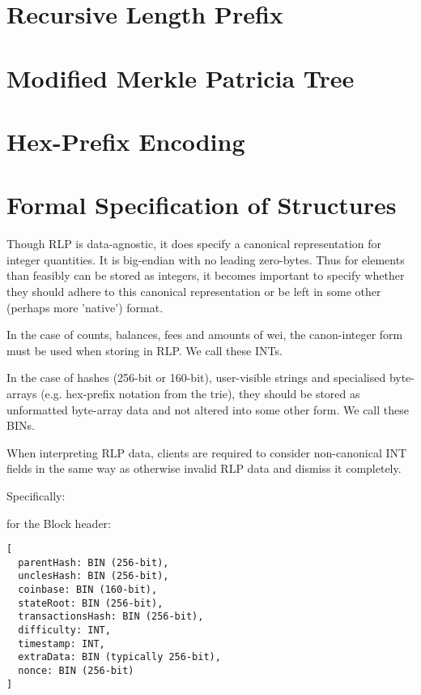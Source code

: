 \documentclass[9pt,oneside]{amsart}
\begin{document}
\begin{multicols}{2}
\begin{description}
\end{description}

\section{Recursive Length Prefix}\label{app:rlp}

\section{Modified Merkle Patricia Tree}\label{app:trie}

\section{Hex-Prefix Encoding}\label{app:hexprefix}

\section{Formal Specification of Structures}

Though RLP is data-agnostic, it does specify a canonical representation for integer quantities. It is big-endian with no leading zero-bytes. Thus for elements than feasibly can be stored as integers, it becomes important to specify whether they should adhere to this canonical representation or be left in some other (perhaps more 'native') format.

In the case of counts, balances, fees and amounts of wei, the canon-integer form must be used when storing in RLP. We call these INTs.

In the case of hashes (256-bit or 160-bit), user-visible strings and specialised byte-arrays (e.g. hex-prefix notation from the trie), they should be stored as unformatted byte-array data and not altered into some other form. We call these BINs.

When interpreting RLP data, clients are required to consider non-canonical INT fields in the same way as otherwise invalid RLP data and dismiss it completely.

Specifically:

for the Block header:
\begin{verbatim}
[
  parentHash: BIN (256-bit),
  unclesHash: BIN (256-bit),
  coinbase: BIN (160-bit),
  stateRoot: BIN (256-bit),
  transactionsHash: BIN (256-bit),
  difficulty: INT,
  timestamp: INT,
  extraData: BIN (typically 256-bit),
  nonce: BIN (256-bit)
]
\end{verbatim}


\end{multicols}
\end{document}
